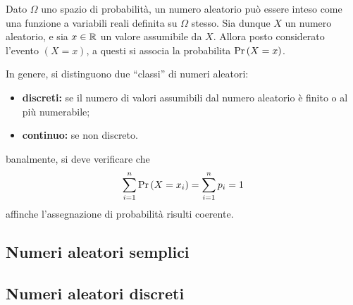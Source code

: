 \documentclass{subfiles}
\begin{document}
Dato \(\Omega\) uno spazio di probabilità, un numero aleatorio può essere inteso come una funzione a variabili reali definita su \(\Omega\) stesso.
Sia dunque \(X\) un numero aleatorio, e sia \(x \in \operatorname{\mathbb{R}}\) un valore assumibile da \(X\).
Allora posto considerato l'evento \((X = x)\), a questi si associa la probabilita \(\Prob{X = x}\).

In genere, si distinguono due ``classi'' di numeri aleatori:
\begin{itemize}
    \item \textbf{discreti:} se il numero di valori assumibili dal numero aleatorio è finito o al più numerabile;
    \item \textbf{continuo:} se non discreto.
\end{itemize}
\begin{Remark*}
    banalmente, si deve verificare che
    \[
        \Sum{\Prob{X = x_{i}}}{i = 1}[n] = \Sum{p_{i}}{i = 1}[n] = 1
    \]
    affinche l'assegnazione di probabilità risulti coerente.
\end{Remark*}

\subsection{Numeri aleatori semplici}

\clearpage

\subsection{Numeri aleatori discreti}

\end{document}
